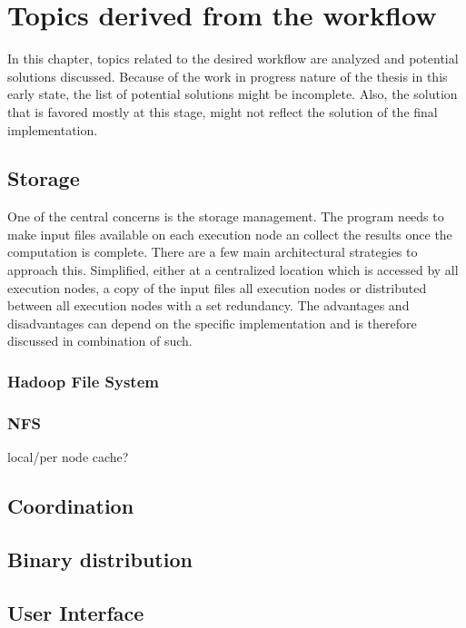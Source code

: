 \chapter{Topics derived from the workflow}

In this chapter, topics related to the desired workflow are analyzed and potential solutions discussed.
Because of the work in progress nature of the thesis in this early state, the list of potential solutions might be incomplete.
Also, the solution that is favored mostly at this stage, might not reflect the solution of the final implementation.

\section{Storage}

One of the central concerns is the storage management.
The program needs to make input files available on each execution node an collect the results once the computation is complete.
There are a few main architectural strategies to approach this.
Simplified, either at a centralized location which is accessed by all execution nodes, a copy of the input files all execution nodes or distributed between all execution nodes with a set redundancy.
The advantages and disadvantages can depend on the specific implementation and is therefore discussed in combination of such.

\subsection{Hadoop File System}

\cite{hdfs:main}
\cite{hdfs:doc}

\subsection{NFS}

local/per node cache?

\section{Coordination}

\section{Binary distribution}

\section{User Interface}




